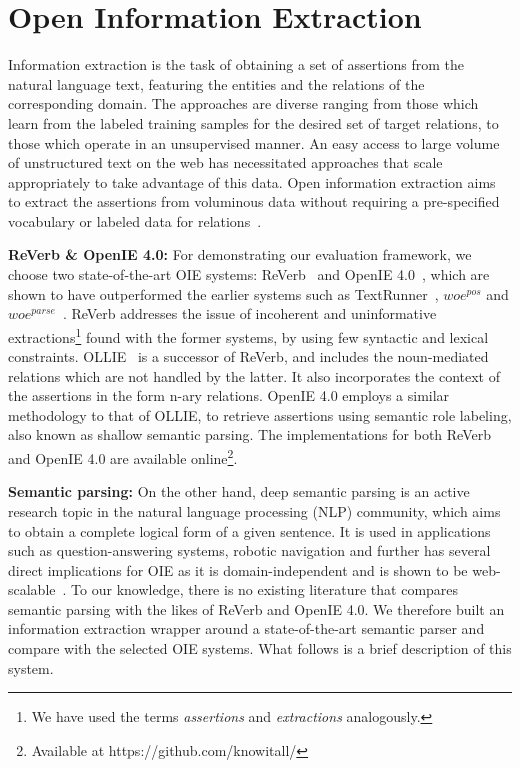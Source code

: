 \documentclass{llncs}
\begin{document}
\section{Open Information Extraction}
\label{sec:oie}
Information extraction is the task of obtaining a set of assertions from the natural language text, featuring the entities and the relations of the corresponding domain. The approaches are diverse ranging from those which learn from the labeled training samples for the desired set of target relations, to those which operate in an unsupervised manner. An easy access to large volume of unstructured text on the web has necessitated approaches that scale appropriately to take advantage of this data. Open information extraction aims to extract the assertions from voluminous data without requiring a pre-specified vocabulary or labeled data for relations~\cite{Etzioni2008a}.

\medskip
\noindent
\textbf{ReVerb \& OpenIE 4.0:}
For demonstrating our evaluation framework, we choose two state-of-the-art OIE systems: ReVerb~\cite{Fader2011a} and OpenIE 4.0~\cite{Mausam2012a}, which are shown to have outperformed the earlier systems such as TextRunner~\cite{Etzioni2008a}, $woe^{pos}$ and $woe^{parse}$~\cite{Wu2010a}. ReVerb addresses the issue of incoherent and uninformative extractions\footnote{We have used the terms \textit{assertions} and \textit{extractions} analogously.} found with the former systems, by using few syntactic and lexical constraints. OLLIE~\cite{Mausam2012a} is a successor of ReVerb, and includes the noun-mediated relations which are not handled by the latter. It also incorporates the context of the assertions in the form n-ary relations. OpenIE 4.0 employs a similar methodology to that of OLLIE, to retrieve assertions using semantic role labeling, also known as shallow semantic parsing. The implementations for both ReVerb and OpenIE 4.0 are available online\footnote{Available at https://github.com/knowitall/}.

\medskip
\noindent
\textbf{Semantic parsing:}
On the other hand, deep semantic parsing is an active research topic in the natural language processing (NLP) community, which aims to obtain a complete logical form of a given sentence. It is used in applications such as question-answering systems, robotic navigation and further has several direct implications for OIE as it is domain-independent and is shown to be web-scalable~\cite{Harrington2007}. To our knowledge, there is no existing literature that compares semantic parsing with the likes of ReVerb and OpenIE 4.0. We therefore built an information extraction wrapper around a state-of-the-art semantic parser and compare with the selected OIE systems. What follows is a brief description of this system.
\end{document}
